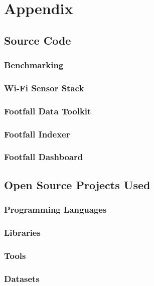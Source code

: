 \chapter{Appendix}

\section{Source Code}
  \subsection{Benchmarking} \label{appendix:benchmark}
  \subsection{Wi-Fi Sensor Stack}
  \subsection{Footfall Data Toolkit}
  \subsection{Footfall Indexer}
  \subsection{Footfall Dashboard}
\section{Open Source Projects Used}
  \subsection{Programming Languages}
  \subsection{Libraries}
  \subsection{Tools}
  \subsection{Datasets}

\backmatter


\printindex 

